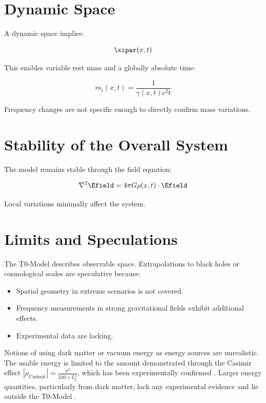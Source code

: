 \section{Dynamic Space}
\label{sec:dynamic_space}

A dynamic space implies:

\begin{equation}
	\xipar(x,t)
	\label{eq:xi_dynamic}
\end{equation}

This enables variable rest mass and a globally absolute time:

\begin{equation}
	m_i(x,t) = \frac{1}{\gamma(x,t) c^2 t}
	\label{eq:mass_time_relation}
\end{equation}

Frequency changes are not specific enough to directly confirm mass variations.

\section{Stability of the Overall System}
\label{sec:stability}

The model remains stable through the field equation:

\begin{equation}
	\nabla^2 \Efield = 4\pi G \rho(x,t) \cdot \Efield
	\label{eq:field_equation}
\end{equation}

Local variations minimally affect the system.

\section{Limits and Speculations}
\label{sec:limits}

The T0-Model describes observable space. Extrapolations to black holes or cosmological scales are speculative because:

\begin{itemize}
	\item Spatial geometry in extreme scenarios is not covered.
	\item Frequency measurements in strong gravitational fields exhibit additional effects.
	\item Experimental data are lacking.
\end{itemize}

\begin{critical}
	Notions of using dark matter or vacuum energy as energy sources are unrealistic. The usable energy is limited to the amount demonstrated through the Casimir effect 
	\( |\rho_{\text{Casimir}}| = \frac{\pi^2}{240 \times L_\xi^4} \), which has been experimentally confirmed \cite{Casimir1948}. 
	Larger energy quantities, particularly from dark matter, lack any experimental evidence and lie outside the T0-Model \cite{pascher_t0_energy_2025}.
\end{critical}

